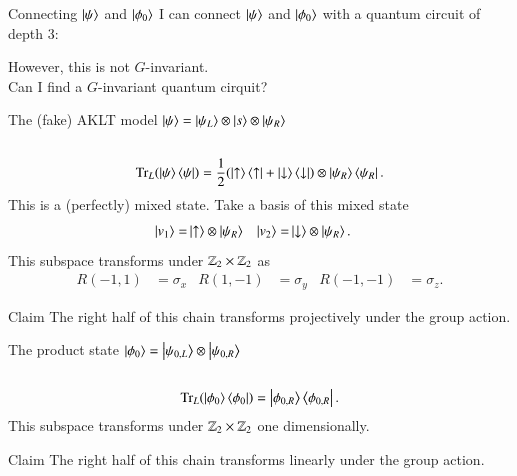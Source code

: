 \documentclass{beamer}
\begin{document}
\begin{frame}{Connecting $\ket{\psi}$ and $\ket{\phi_0}$}
	I can connect $\ket{\psi}$ and $\ket{\phi_0}$ with a quantum circuit of depth 3:
	\begin{center}
		\scalebox{0.75}{
		
		}
	\end{center}
	\pause
	However, this is not $G$-invariant.\\
	\pause
	Can I find a $G$-invariant quantum cirquit?
\end{frame}

\begin{frame}{The (fake) AKLT model}
	$\ket{\psi}=\ket{\psi_L}\otimes\ket{s}\otimes\ket{\psi_R}$ \\
	\\
	\pause
	\begin{equation*}
		\textrm{Tr}_L(\ket{\psi}\bra{\psi})=\frac{1}{2}(\ket{\uparrow}\bra{\uparrow}+\ket{\downarrow}\bra{\downarrow})\otimes\ket{\psi_R}\bra{\psi_R}.
	\end{equation*}
	This is a (perfectly) mixed state. Take a basis of this mixed state
	\begin{align*}
		\ket{v_1}=&\ket{\uparrow}\otimes\ket{\psi_R}&\ket{v_2}=&\ket{\downarrow}\otimes\ket{\psi_R}.
	\end{align*}
	\pause
	This subspace transforms under $\mathbb{Z}_2\times\mathbb{Z}_2$ as
	\begin{align*}
		R(-1,1)&=\sigma_x&R(1,-1)&=\sigma_y&R(-1,-1)&=\sigma_z.
	\end{align*}
	\begin{block}{Claim}
		The right half of this chain transforms projectively under the group action.
	\end{block}
\end{frame}

\begin{frame}{The product state}
	$\ket{\phi_0}=\ket{\psi_{0,L}}\otimes\ket{\psi_{0,R}}$ \\
	\\
	\pause
	\begin{equation*}
		\textrm{Tr}_L(\ket{\phi_0}\bra{\phi_0})=\ket{\phi_{0,R}}\bra{\phi_{0,R}}.
	\end{equation*}
	\pause
	This subspace transforms under $\mathbb{Z}_2\times\mathbb{Z}_2$ one dimensionally.
	\begin{block}{Claim}
		The right half of this chain transforms linearly under the group action.
	\end{block}
\end{frame}
\end{document}
